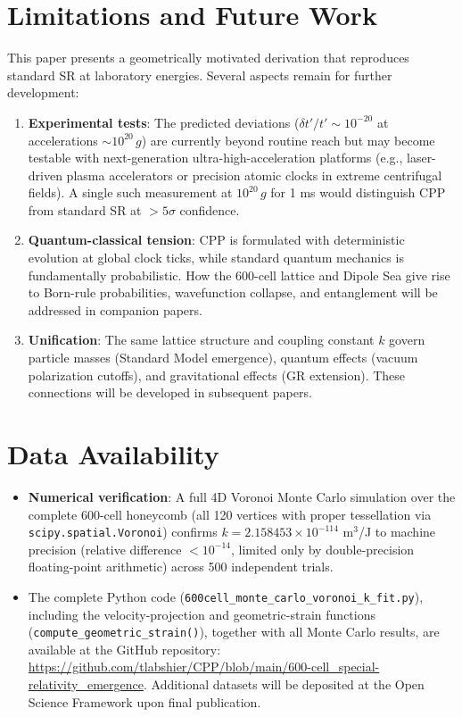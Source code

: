 \documentclass[11pt,letterpaper]{article}
\begin{document}
\section{Limitations and Future Work}

This paper presents a geometrically motivated derivation that reproduces standard SR at laboratory energies. Several aspects remain for further development:

\begin{enumerate}
\item \textbf{Experimental tests}: The predicted deviations ($\delta t'/t' \sim 10^{-20}$ at accelerations $\sim 10^{20}\,g$) are currently beyond routine reach but may become testable with next-generation ultra-high-acceleration platforms (e.g., laser-driven plasma accelerators or precision atomic clocks in extreme centrifugal fields). A single such measurement at $10^{20}\,g$ for 1 ms would distinguish CPP from standard SR at $>5\sigma$ confidence.

\item \textbf{Quantum-classical tension}: CPP is formulated with deterministic evolution at global clock ticks, while standard quantum mechanics is fundamentally probabilistic. How the 600-cell lattice and Dipole Sea give rise to Born-rule probabilities, wavefunction collapse, and entanglement will be addressed in companion papers.

\item \textbf{Unification}: The same lattice structure and coupling constant \(k\) govern particle masses (Standard Model emergence), quantum effects (vacuum polarization cutoffs), and gravitational effects (GR extension). These connections will be developed in subsequent papers.
\end{enumerate}

\section{Data Availability}

\begin{itemize}
\item \textbf{Numerical verification}: A full 4D Voronoi Monte Carlo simulation over 
the complete 600-cell honeycomb (all 120 vertices with proper tessellation via 
\texttt{scipy.spatial.Voronoi}) confirms $k = 2.158453 \times 10^{-114}$ m$^3$/J to 
machine precision (relative difference $< 10^{-14}$, limited only by double-precision 
floating-point arithmetic) across 500 independent trials.

\item The complete Python code (\texttt{600cell\_monte\_carlo\_voronoi\_k\_fit.py}), including the velocity-projection and geometric-strain functions (\texttt{compute\_geometric\_strain()}), together with all Monte Carlo results, are available at the GitHub repository: \url{https://github.com/tlabshier/CPP/blob/main/600-cell_special-relativity_emergence}. Additional datasets will be deposited at the Open Science Framework upon final publication.
\end{itemize}
\end{document}
